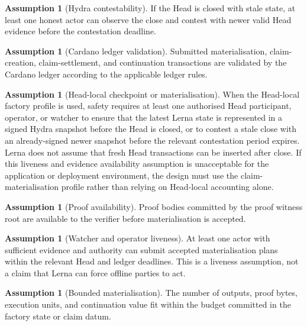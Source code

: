 \documentclass[a4paper,11pt]{article}
\theoremstyle{definition}
\newtheorem{assumption}[definition]{Assumption}
\theoremstyle{plain}
\theoremstyle{remark}
\begin{document}
\begin{assumption}[Hydra contestability]
\label{asm:hydra-contestability}
If the Head is closed with stale state, at least one honest actor can observe
the close and contest with newer valid Head evidence before the contestation
deadline.
\end{assumption}

\begin{assumption}[Cardano ledger validation]
\label{asm:ledger-validation}
Submitted materialisation, claim-creation, claim-settlement, and continuation
transactions are validated by the Cardano ledger according to the applicable
ledger rules.
\end{assumption}

\begin{assumption}[Head-local checkpoint or materialisation]
\label{asm:head-local-checkpoint}
When the Head-local factory profile is used, safety requires at least one
authorised Head participant, operator, or watcher to ensure that the latest
Lerna state is represented in a signed Hydra snapshot before the Head is
closed, or to contest a stale close with an already-signed newer snapshot before
the relevant contestation period expires. Lerna does not assume that fresh Head
transactions can be inserted after close. If this liveness and evidence
availability assumption is unacceptable for the application or deployment
environment, the design must use the claim-materialisation profile rather than
relying on Head-local accounting alone.
\end{assumption}

\begin{assumption}[Proof availability]
\label{asm:proof-availability}
Proof bodies committed by the proof witness root are available to the verifier
before materialisation is accepted.
\end{assumption}

\begin{assumption}[Watcher and operator liveness]
\label{asm:liveness}
At least one actor with sufficient evidence and authority can submit accepted
materialisation plans within the relevant Head and ledger deadlines. This is a
liveness assumption, not a claim that Lerna can force offline parties to act.
\end{assumption}

\begin{assumption}[Bounded materialisation]
\label{asm:bounded-materialisation}
The number of outputs, proof bytes, execution units, and continuation value fit
within the budget committed in the factory state or claim datum.
\end{assumption}
\end{document}
